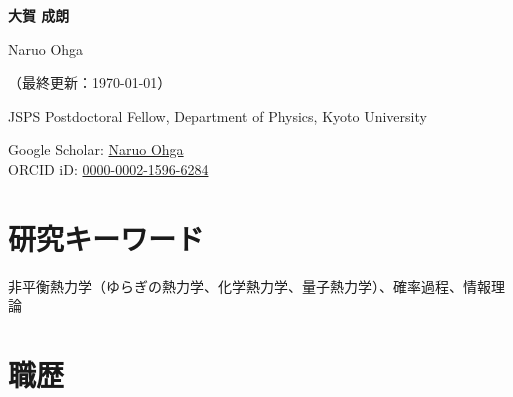 \documentclass[11pt,a4paper,uplatex,nomag,dvipdfmx]{jsarticle}
\newcommand{\je}[2]{#1}
\newcommand{\je}[2]{#2}
\newcounter{issubmission}
\newcommand{\ifsubmission}{\ifodd\value{issubmission}}
\newcommand{\ifwebpage}{\ifodd\value{issubmission}\relax\else}
\begin{document}
\begin{center}
\Huge \textbf{\je{大賀 成朗}{Naruo Ohga}}

\LARGE {\je{Naruo Ohga}{\vspace{0.3\baselineskip}}}

\ifwebpage
\normalsize \je{（最終更新：\today）}{(Last modified: \today)}
\fi

\ifsubmission
\vspace{-0.3\baselineskip}
\normalsize JSPS Postdoctoral Fellow, Department of Physics, Kyoto University
\vspace{-0.2\baselineskip}
\fi

\end{center}



\hspace{3em}
%
Google Scholar:
\je{\href{https://scholar.google.com/citations?user=jOdc58QAAAAJ&hl=ja}{Naruo Ohga}}{\href{https://scholar.google.com/citations?user=jOdc58QAAAAJ}{Naruo Ohga}} \\
\hspace{3em}
%
ORCID iD:
\href{https://orcid.org/0000-0002-1596-6284}{0000-0002-1596-6284}


\section{\je{研究キーワード}{Research Profile}}
\je
{非平衡熱力学（ゆらぎの熱力学、化学熱力学、量子熱力学）、確率過程、情報理論}
{Theoretical physicist working on the nonequilibrium thermodynamics of stochastic, chemical, and quantum systems. Particularly interested in uncovering universal laws and building frameworks, such as thermodynamic bounds/inference, eigenvalue bounds, and control methods, using mathematical techniques from stochastic processes, information theory, and various inequalities.}


\ifwebpage
\section{\je{職歴}{Academic Appointments}}
\fi 
\end{document}
